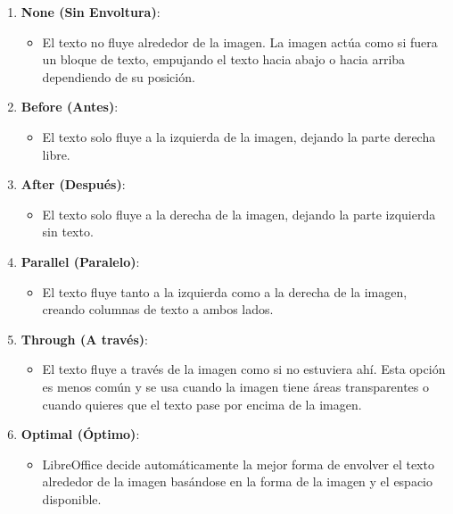 \documentclass[
  jou,
  floatsintext,
  longtable,
  a4paper,
  nolmodern,
  notxfonts,
  notimes,
  colorlinks=true,linkcolor=blue,citecolor=blue,urlcolor=blue]{apa7}
\providecommand{\tightlist}{%
  \setlength{\itemsep}{0pt}\setlength{\parskip}{0pt}}
\begin{document}
\begin{enumerate}
\def\labelenumi{\arabic{enumi}.}
\item
  \textbf{None (Sin Envoltura)}:

  \begin{itemize}
  \tightlist
  \item
    El texto no fluye alrededor de la imagen. La imagen actúa como si
    fuera un bloque de texto, empujando el texto hacia abajo o hacia
    arriba dependiendo de su posición.
  \end{itemize}
\item
  \textbf{Before (Antes)}:

  \begin{itemize}
  \tightlist
  \item
    El texto solo fluye a la izquierda de la imagen, dejando la parte
    derecha libre.
  \end{itemize}
\item
  \textbf{After (Después)}:

  \begin{itemize}
  \tightlist
  \item
    El texto solo fluye a la derecha de la imagen, dejando la parte
    izquierda sin texto.
  \end{itemize}
\item
  \textbf{Parallel (Paralelo)}:

  \begin{itemize}
  \tightlist
  \item
    El texto fluye tanto a la izquierda como a la derecha de la imagen,
    creando columnas de texto a ambos lados.
  \end{itemize}
\item
  \textbf{Through (A través)}:

  \begin{itemize}
  \tightlist
  \item
    El texto fluye a través de la imagen como si no estuviera ahí. Esta
    opción es menos común y se usa cuando la imagen tiene áreas
    transparentes o cuando quieres que el texto pase por encima de la
    imagen.
  \end{itemize}
\item
  \textbf{Optimal (Óptimo)}:

  \begin{itemize}
  \tightlist
  \item
    LibreOffice decide automáticamente la mejor forma de envolver el
    texto alrededor de la imagen basándose en la forma de la imagen y el
    espacio disponible.
  \end{itemize}
\end{enumerate}
\end{document}
